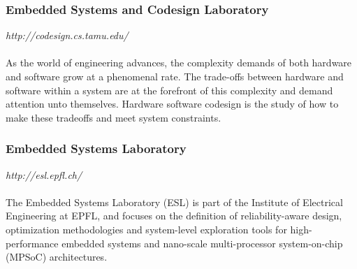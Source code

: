 \documentclass[12pt]{article}
\begin{document}
\subsubsection{Embedded Systems and Codesign Laboratory}
\textit{http://codesign.cs.tamu.edu/}
\\ \hfill \\
As the world of engineering advances, the complexity demands of both hardware and software grow at a phenomenal rate. The trade-offs between hardware and software within a system are at the forefront of this complexity and demand attention unto themselves. Hardware software codesign is the study of how to make these tradeoffs and meet system constraints.

\subsubsection{Embedded Systems Laboratory}
\textit{http://esl.epfl.ch/}
\\ \hfill \\
The Embedded Systems Laboratory (ESL) is part of the Institute of Electrical Engineering at EPFL, and focuses on the definition of reliability-aware design, optimization methodologies and system-level exploration tools for high-performance embedded systems and nano-scale multi-processor system-on-chip (MPSoC) architectures.
\end{document}
